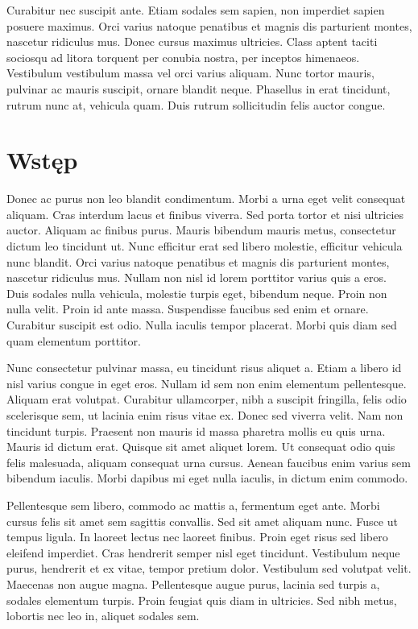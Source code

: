 \documentclass[polish,engineering]{wizthesis}
\begin{document}
Curabitur nec suscipit ante. Etiam sodales sem sapien, non imperdiet sapien posuere maximus. Orci varius natoque penatibus et magnis dis parturient montes, nascetur ridiculus mus. Donec cursus maximus ultricies. 
Class aptent taciti sociosqu ad litora torquent per conubia nostra, per inceptos himenaeos. Vestibulum vestibulum massa vel orci varius aliquam. Nunc tortor mauris, pulvinar ac mauris suscipit, ornare blandit neque. Phasellus in erat tincidunt, rutrum nunc at, vehicula quam. Duis rutrum sollicitudin felis auctor congue.

\tableofcontents

\mainmatter %

{\backmatter\chapter{Wstęp}} %

Donec ac purus non leo blandit condimentum. Morbi a urna eget velit consequat aliquam. Cras interdum lacus et finibus viverra. Sed porta tortor et nisi ultricies auctor. Aliquam ac finibus purus. Mauris bibendum mauris metus, consectetur dictum leo tincidunt ut. Nunc efficitur erat sed libero molestie, efficitur vehicula nunc blandit.
Orci varius natoque penatibus et magnis dis parturient montes, nascetur ridiculus mus. Nullam non nisl id lorem porttitor varius quis a eros. Duis sodales nulla vehicula, molestie turpis eget, bibendum neque. Proin non nulla velit. Proin id ante massa. Suspendisse faucibus sed enim et ornare. Curabitur suscipit est odio. Nulla iaculis tempor placerat. Morbi quis diam sed quam elementum porttitor.

Nunc consectetur pulvinar massa, eu tincidunt risus aliquet a. Etiam a libero id nisl varius congue in eget eros. Nullam id sem non enim elementum pellentesque. Aliquam erat volutpat. Curabitur ullamcorper, nibh a suscipit fringilla, felis odio scelerisque sem, ut lacinia enim risus vitae ex. Donec sed viverra velit. Nam non tincidunt turpis.
Praesent non mauris id massa pharetra mollis eu quis urna. Mauris id dictum erat. Quisque sit amet aliquet lorem. Ut consequat odio quis felis malesuada, aliquam consequat urna cursus. Aenean faucibus enim varius sem bibendum iaculis. Morbi dapibus mi eget nulla iaculis, in dictum enim commodo.

Pellentesque sem libero, commodo ac mattis a, fermentum eget ante. Morbi cursus felis sit amet sem sagittis convallis. Sed sit amet aliquam nunc. Fusce ut tempus ligula. In laoreet lectus nec laoreet finibus. Proin eget risus sed libero eleifend imperdiet.
Cras hendrerit semper nisl eget tincidunt. Vestibulum neque purus, hendrerit et ex vitae, tempor pretium dolor. Vestibulum sed volutpat velit. Maecenas non augue magna. Pellentesque augue purus, lacinia sed turpis a, sodales elementum turpis. Proin feugiat quis diam in ultricies. Sed nibh metus, lobortis nec leo in, aliquet sodales sem.
\end{document}
